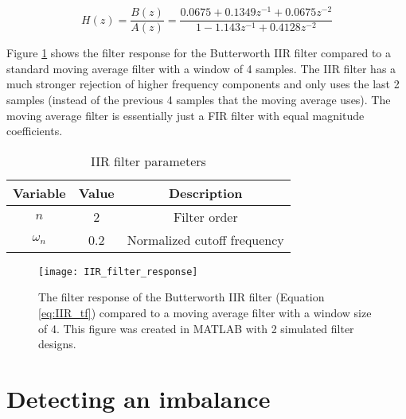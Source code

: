 \begin{equation} \label{eq:IIR_tf}
	H(z) = \frac{B(z)}{A(z)} = \frac{0.0675 + 0.1349z^{-1} + 0.0675z^{-2}}{1-1.143z^{-1} + 0.4128z^{-2}}
\end{equation}

Figure \ref{fig:IIR_filter_response} shows the filter response for the Butterworth IIR filter compared to a standard moving average filter with a window of 4 samples.  The IIR filter has a much stronger rejection of higher frequency components and only uses the last 2 samples (instead of the previous 4 samples that the moving average uses).  The moving average filter is essentially just a FIR filter with equal magnitude coefficients.

\begin{table}[]
\centering
\caption{IIR filter parameters}
\label{t:IIR_filter_parameters}
\vspace*{0.2in}
\begin{tabular}{|c|c|c|}
\rowcolor[HTML]{EFEFEF} 
\hline
\textbf{Variable} & \textbf{Value} & \textbf{Description} \\ \hline
$n$ & 2 & Filter order \\ \hline
$\omega_n$ & 0.2 & Normalized cutoff frequency \\ \hline
\end{tabular}
\end{table}


\begin{figure}
	\centering
	\texttt{[image: IIR\_filter\_response]}
	\decoRule
	\caption{The filter response of the Butterworth IIR filter (Equation \ref{eq:IIR_tf}) compared to a moving average filter with a window size of 4.  This figure was created in MATLAB with 2 simulated filter designs.}
	\label{fig:IIR_filter_response}
\end{figure}


\section{Detecting an imbalance}


